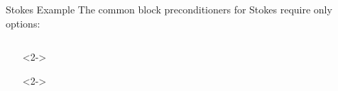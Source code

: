 \begin{frame}[fragile]{Stokes Example}
The common block preconditioners for Stokes require only options:
\begin{columns}
\begin{column}[c]{0.7\textwidth}
\begin{itemize}
  \item[]<2-> 
  \item[]<2-> 

\end{itemize}
\end{column}
\end{columns}
\end{frame}
